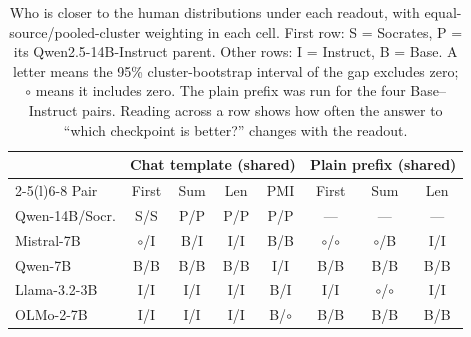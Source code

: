\begin{table}[!b]
\centering\scriptsize
\setlength{\tabcolsep}{2.4pt}
\begin{tabular}{@{}lcccc@{\hspace{5pt}}ccc@{}}
\toprule
& \multicolumn{4}{c}{Chat template (shared)} & \multicolumn{3}{c}{Plain prefix (shared)} \\
\cmidrule(lr){2-5}\cmidrule(l){6-8}
Pair & First & Sum & Len & PMI & First & Sum & Len \\
\midrule
Qwen-14B/Socr. & S/S & P/P & P/P & P/P & --- & --- & --- \\
Mistral-7B & $\circ$/I & B/I & I/I & B/B & $\circ$/$\circ$ & $\circ$/B & I/I \\
Qwen-7B & B/B & B/B & B/B & I/I & B/B & B/B & B/B \\
Llama-3.2-3B & I/I & I/I & I/I & B/I & I/I & $\circ$/$\circ$ & I/I \\
OLMo-2-7B & I/I & I/I & I/I & B/$\circ$ & B/B & B/B & B/B \\
\bottomrule
\end{tabular}
\caption{Who is closer to the human distributions under each readout, with equal-source/pooled-cluster weighting in each cell. First row: S = Socrates, P = its Qwen2.5-14B-Instruct parent. Other rows: I = Instruct, B = Base. A letter means the 95\% cluster-bootstrap interval of the gap excludes zero; $\circ$ means it includes zero. The plain prefix was run for the four Base--Instruct pairs. Reading across a row shows how often the answer to ``which checkpoint is better?'' changes with the readout.}
\label{tab:winner-map}
\end{table}
